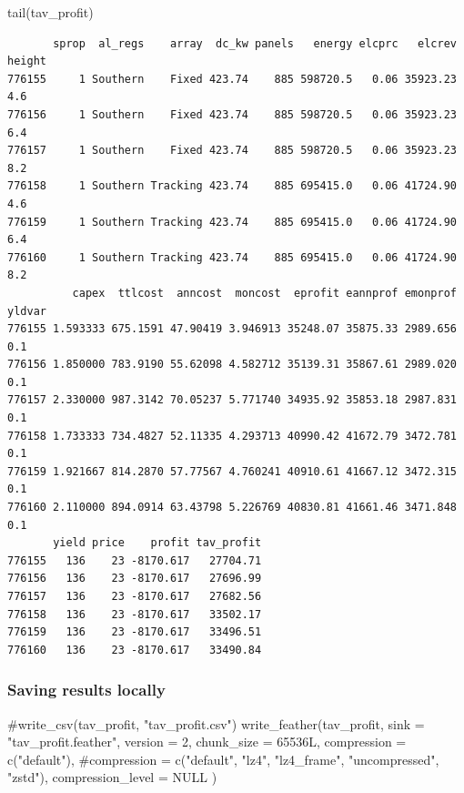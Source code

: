 \documentclass[
  letterpaper,
  DIV=11,
  numbers=noendperiod]{scrartcl}
\newenvironment{Shaded}{\begin{snugshade}}{\end{snugshade}}
\newcommand{\AttributeTok}[1]{\textcolor[rgb]{0.40,0.45,0.13}{#1}}
\newcommand{\CommentTok}[1]{\textcolor[rgb]{0.37,0.37,0.37}{#1}}
\newcommand{\ConstantTok}[1]{\textcolor[rgb]{0.56,0.35,0.01}{#1}}
\newcommand{\DecValTok}[1]{\textcolor[rgb]{0.68,0.00,0.00}{#1}}
\newcommand{\FunctionTok}[1]{\textcolor[rgb]{0.28,0.35,0.67}{#1}}
\newcommand{\NormalTok}[1]{\textcolor[rgb]{0.00,0.23,0.31}{#1}}
\newcommand{\StringTok}[1]{\textcolor[rgb]{0.13,0.47,0.30}{#1}}
\begin{document}
\begin{Shaded}
\begin{Highlighting}[]
\FunctionTok{tail}\NormalTok{(tav\_profit)}
\end{Highlighting}
\end{Shaded}

\begin{verbatim}
       sprop  al_regs    array  dc_kw panels   energy elcprc   elcrev height
776155     1 Southern    Fixed 423.74    885 598720.5   0.06 35923.23    4.6
776156     1 Southern    Fixed 423.74    885 598720.5   0.06 35923.23    6.4
776157     1 Southern    Fixed 423.74    885 598720.5   0.06 35923.23    8.2
776158     1 Southern Tracking 423.74    885 695415.0   0.06 41724.90    4.6
776159     1 Southern Tracking 423.74    885 695415.0   0.06 41724.90    6.4
776160     1 Southern Tracking 423.74    885 695415.0   0.06 41724.90    8.2
          capex  ttlcost  anncost  moncost  eprofit eannprof emonprof yldvar
776155 1.593333 675.1591 47.90419 3.946913 35248.07 35875.33 2989.656    0.1
776156 1.850000 783.9190 55.62098 4.582712 35139.31 35867.61 2989.020    0.1
776157 2.330000 987.3142 70.05237 5.771740 34935.92 35853.18 2987.831    0.1
776158 1.733333 734.4827 52.11335 4.293713 40990.42 41672.79 3472.781    0.1
776159 1.921667 814.2870 57.77567 4.760241 40910.61 41667.12 3472.315    0.1
776160 2.110000 894.0914 63.43798 5.226769 40830.81 41661.46 3471.848    0.1
       yield price    profit tav_profit
776155   136    23 -8170.617   27704.71
776156   136    23 -8170.617   27696.99
776157   136    23 -8170.617   27682.56
776158   136    23 -8170.617   33502.17
776159   136    23 -8170.617   33496.51
776160   136    23 -8170.617   33490.84
\end{verbatim}

\subsubsection{Saving results locally}\label{saving-results-locally}

\begin{Shaded}
\begin{Highlighting}[]
\CommentTok{\#write\_csv(tav\_profit, "tav\_profit.csv")}
\FunctionTok{write\_feather}\NormalTok{(tav\_profit,}
  \AttributeTok{sink =} \StringTok{"tav\_profit.feather"}\NormalTok{,}
  \AttributeTok{version =} \DecValTok{2}\NormalTok{,}
  \AttributeTok{chunk\_size =} \DecValTok{65536}\NormalTok{L,}
  \AttributeTok{compression =} \FunctionTok{c}\NormalTok{(}\StringTok{"default"}\NormalTok{),}
  \CommentTok{\#compression = c("default", "lz4", "lz4\_frame", "uncompressed", "zstd"),}
  \AttributeTok{compression\_level =} \ConstantTok{NULL}
\NormalTok{)}
\end{Highlighting}
\end{Shaded}
\end{document}
